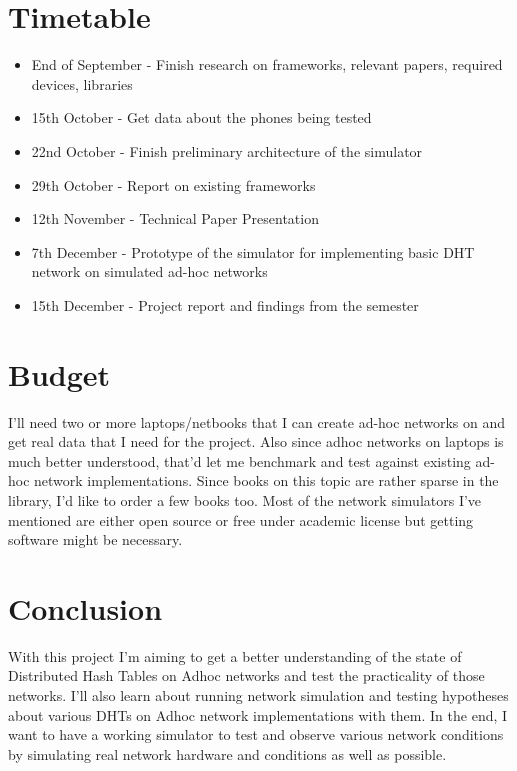 \documentclass[a4paper,10pt]{article}
\begin{document}
\section*{Timetable}
\begin{itemize}
 \item End of September - Finish research on frameworks, relevant papers, required devices, libraries
 \item 15th October - Get data about the phones being tested
 \item 22nd October - Finish preliminary architecture of the simulator
 \item 29th October - Report on existing frameworks 
 \item 12th November - Technical Paper Presentation
 \item 7th December - Prototype of the simulator for implementing basic DHT network on simulated ad-hoc networks
 \item 15th December - Project report and findings from the semester
\end{itemize}

\section*{Budget}
I'll need two or more laptops/netbooks that I can create ad-hoc networks on and get real data that I need for the project. Also since adhoc networks on laptops is much better understood, that'd let me benchmark and test against existing ad-hoc network implementations. Since books on this topic are rather sparse in the library, I'd like to order a few books too. Most of the network simulators I've mentioned are either open source or free under academic license but getting software might be necessary.

\section*{Conclusion}
With this project I'm aiming to get a better understanding of the state of Distributed Hash Tables on Adhoc networks and test the practicality of those networks. I'll also learn about running network simulation and testing hypotheses about various DHTs on Adhoc network implementations with them. In the end, I want to have a working simulator to test and observe various network conditions by simulating real network hardware and conditions as well as possible.
{}

\end{document}
